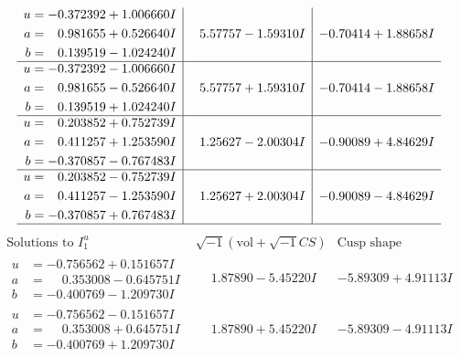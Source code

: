 \documentclass[1p]{elsarticle_modified}
\theoremstyle{definition}
\newcommand{\I}{\sqrt{-1}}
\begin{document}
$$\begin{array}{c|c|c}
\begin{aligned}
u &= -0.372392 + 1.006660 I \\
a &= \phantom{-}0.981655 + 0.526640 I \\
b &= \phantom{-}0.139519 - 1.024240 I\end{aligned}
 & \phantom{-}5.57757 - 1.59310 I & -0.70414 + 1.88658 I \\ \hline\begin{aligned}
u &= -0.372392 - 1.006660 I \\
a &= \phantom{-}0.981655 - 0.526640 I \\
b &= \phantom{-}0.139519 + 1.024240 I\end{aligned}
 & \phantom{-}5.57757 + 1.59310 I & -0.70414 - 1.88658 I \\ \hline\begin{aligned}
u &= \phantom{-}0.203852 + 0.752739 I \\
a &= \phantom{-}0.411257 + 1.253590 I \\
b &= -0.370857 - 0.767483 I\end{aligned}
 & \phantom{-}1.25627 - 2.00304 I & -0.90089 + 4.84629 I \\ \hline\begin{aligned}
u &= \phantom{-}0.203852 - 0.752739 I \\
a &= \phantom{-}0.411257 - 1.253590 I \\
b &= -0.370857 + 0.767483 I\end{aligned}
 & \phantom{-}1.25627 + 2.00304 I & -0.90089 - 4.84629 I\\
 \hline 
 \end{array}$$\newpage$$\begin{array}{c|c|c}  
\text{Solutions to }I^u_{1}& \I (\text{vol} + \sqrt{-1}CS) & \text{Cusp shape}\\
 \hline 
\begin{aligned}
u &= -0.756562 + 0.151657 I \\
a &= \phantom{-}0.353008 - 0.645751 I \\
b &= -0.400769 - 1.209730 I\end{aligned}
 & \phantom{-}1.87890 - 5.45220 I & -5.89309 + 4.91113 I \\ \hline\begin{aligned}
u &= -0.756562 - 0.151657 I \\
a &= \phantom{-}0.353008 + 0.645751 I \\
b &= -0.400769 + 1.209730 I\end{aligned}
 & \phantom{-}1.87890 + 5.45220 I & -5.89309 - 4.91113 I \\ \hline\begin{aligned}

\end{aligned}
\end{array}$$
\end{document}
